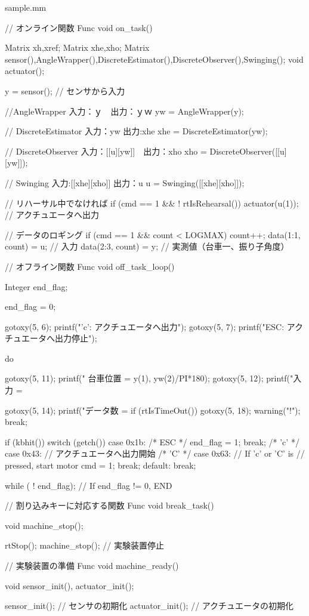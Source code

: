 \begin{itembox}[l]{sample.mm}
\begin{verbatimtab}[4]
// オンライン関数
Func void on_task()
{
	Matrix xh,xref;
	Matrix xhe,xho;
	Matrix sensor(),AngleWrapper(),DiscreteEstimator(),DiscreteObserver(),Swinging();
	void actuator();

	y = sensor();				// センサから入力

	//AngleWrapper 入力：ｙ　出力：ｙｗ
    	yw = AngleWrapper(y);

	// DiscreteEstimator 入力：yw 出力:xhe
	xhe = DiscreteEstimator(yw);

	// DiscreteObserver 入力：[[u][yw]]　出力：xho
	xho = DiscreteObserver([[u][yw]]);

	// Swinging 入力:[[xhe][xho]] 出力：u
	u = Swinging([[xhe][xho]]);

	// リハーサル中でなければ
	if (cmd == 1 && ! rtIsRehearsal()) {
		actuator(u(1));	 		// アクチュエータへ出力
	}

	// データのロギング
	if (cmd == 1 && count < LOGMAX) {
		count++;
		data(1:1, count) = u; // 入力
		data(2:3, count) = y; // 実測値（台車一、振り子角度）
	}
}

// オフライン関数
Func void off_task_loop()
{
	Integer end_flag;

	end_flag = 0;

	gotoxy(5, 6);
	printf("'c': アクチュエータへ出力");
	gotoxy(5, 7);
	printf("ESC: アクチュエータへ出力停止");

	do {
		gotoxy(5, 11);
		printf("  台車位置 = %
			y(1), yw(2)/PI*180);
		gotoxy(5, 12);
		printf("入力 = %

		gotoxy(5, 14);
		printf("データ数 = %
		if (rtIsTimeOut()) {
			gotoxy(5, 18);
			warning(" !\n");
			break;
		}

		if (kbhit()) {
			switch (getch()) {
			  case 0x1b:            /* ESC */
				end_flag = 1;
				break;
		/* 'c' */  case 0x43: // アクチュエータへ出力開始
		/* 'C' */  case 0x63: // If 'c' or 'C' is 
				      // pressed, start motor
				cmd = 1;
				break;
			  default:
				break;
			}
		}
    } while ( ! end_flag);  // If end_flag != 0, END
}

// 割り込みキーに対応する関数
Func void break_task()
{
	void machine_stop();

	rtStop();
	machine_stop(); // 実験装置停止
}

// 実験装置の準備
Func void machine_ready()
{
	void sensor_init(), actuator_init();

	sensor_init();                  // センサの初期化
	actuator_init();                // アクチュエータの初期化

}
\end{verbatimtab}
\end{itembox}
